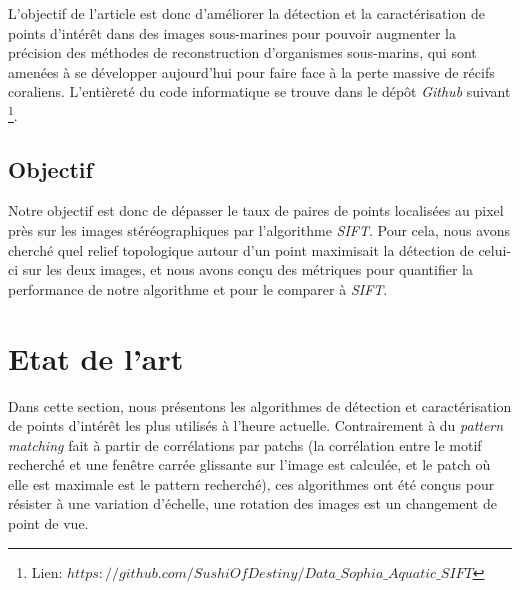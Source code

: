 \documentclass[
	a4paper, %
	10pt, %
	unnumberedsections, %
	twoside, %
]{LTJournalArticle}
\begin{document}
L'objectif de l'article est donc d'améliorer la détection et la caractérisation de points d'intérêt dans des images sous-marines pour pouvoir augmenter la précision des méthodes de reconstruction d'organismes sous-marins, qui sont amenées à se développer aujourd'hui pour faire face à la perte massive de récifs coraliens.
L'entièreté du code informatique se trouve dans le dépôt \textit{Github} suivant \footnote{Lien: \href{https://github.com/SushiOfDestiny/Data_Sophia_Aquatic_SIFT}{$https://github.com/SushiOfDestiny/Data\_Sophia\_Aquatic\_SIFT$}}.

\subsection{Objectif}

Notre objectif est donc %
de dépasser le taux de paires de points localisées au pixel près sur les images stéréographiques par l'algorithme \textit{SIFT}.
Pour cela, %
nous avons cherché quel relief topologique autour d'un point maximisait la détection de celui-ci sur les deux images,
et nous avons conçu des métriques pour quantifier la performance de notre algorithme et pour le comparer à \textit{SIFT}.


\section{Etat de l'art}

Dans cette section, nous présentons les algorithmes de détection et caractérisation de points d'intérêt %
les plus utilisés à l'heure actuelle.
Contrairement à du \textit{pattern matching} fait à partir de corrélations par patchs (la corrélation entre le motif recherché et une fenêtre carrée glissante sur l'image est calculée, et le patch où elle est maximale est le pattern recherché),
ces algorithmes ont été conçus pour résister à une variation d'échelle, une rotation des images est un changement de point de vue.
\end{document}
